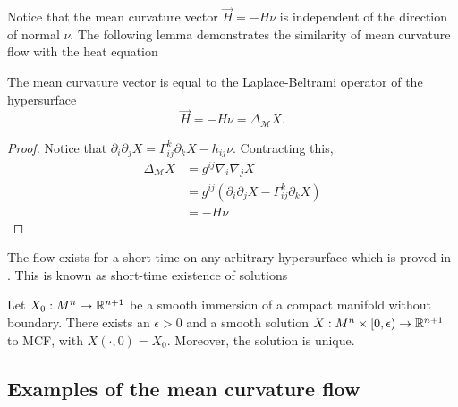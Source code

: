 Notice that the mean curvature vector $ \vec{H} = -H \nu  $ is independent of the direction of normal $ \nu $. %
The following lemma demonstrates the similarity of mean curvature flow with the heat equation 

\begin{lemma}
    The mean curvature vector is equal to the Laplace-Beltrami operator of the hypersurface  
    \[ \vec{H} = -H \nu = \Delta_{\mathcal{M}}X . \]
\end{lemma}
\begin{proof}
    Notice that $ \partial_{i}\partial_{j}X = \Gamma_{ij}^{k}\partial_{k}X - h_{ij}\nu $. Contracting this, 
    \begin{align*}
        \Delta_{\mathcal{M}}X & = g^{ij}\nabla_{i}\nabla_{j}X \\
        & = g^{ij}(\partial_{i}\partial_{j}X - \Gamma_{ij}^{k}\partial_{k}X) \\
        & = - H \nu
    \end{align*}
    
\end{proof}

The flow exists for a short time on any arbitrary hypersurface which is proved in \cite{andrews2022extrinsic}. This is known as short-time existence of solutions
\begin{thm}
    Let $ X_{0}: M^{n} \to \mathbb{R}^{n+1} $ be a smooth immersion of a compact manifold without boundary. There exists an $ \epsilon >0 $ and a smooth solution $ X : M^{n} \times [0, \epsilon) \to \mathbb{R}^{n+1}$ to MCF, with $ X( \cdot, 0) = X_{0} $. Moreover, the solution is unique.
\end{thm}

\subsection{Examples of the mean curvature flow}

